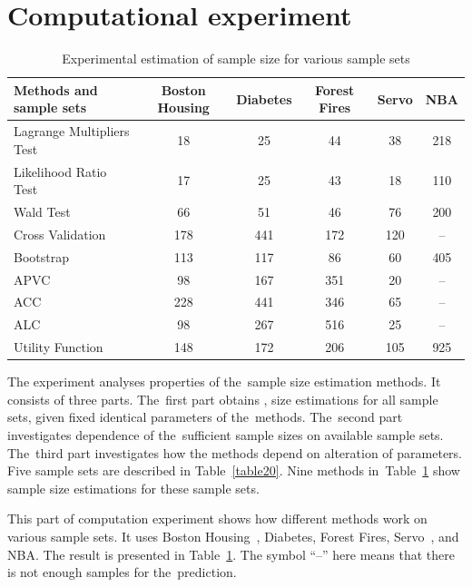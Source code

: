 \documentclass[
11pt,%
tightenlines,%
twoside,%
onecolumn,%
nofloats,%
nobibnotes,%
nofootinbib,%
superscriptaddress,%
noshowpacs,%
centertags]%
{revtex4}
\begin{document}
\section{Computational experiment}
\begin{table}[!htp]
\centering
\caption{Experimental estimation of sample size  for various sample sets}
\label{table2}
\begin{tabular}{l|c|c|c|c|c}
\hline
 Methods and sample sets & Boston Housing & Diabetes & Forest Fires & Servo & NBA \\ \hline
Lagrange Multipliers Test & 18 & 25 & 44 & 38 & 218 \\ \hline
Likelihood Ratio Test & 17 & 25 & 43 & 18 & 110 \\ \hline
Wald Test & 66 & 51 & 46 & 76 & 200 \\ \hline
Cross Validation & 178 & 441 & 172 & 120 & -- \\ \hline
Bootstrap & 113 & 117 & 86 & 60 & 405 \\ \hline
APVC & 98 & 167 & 351 & 20 & -- \\ \hline
ACC & 228 & 441 & 346 & 65 & -- \\ \hline
ALC & 98 & 267 & 516 & 25 & -- \\ \hline
Utility Function & 148 & 172 & 206 & 105 & 925 \\ \hline
\end{tabular}
\end{table}

The experiment analyses  properties of the~sample size  estimation
methods. It consists of three parts. The~first part obtains , size
estimations for all sample sets, given fixed identical parameters of
the~methods. The~second part investigates dependence of
the~sufficient sample sizes on available sample sets. The~third part
investigates how the methods depend on alteration of parameters.
Five sample sets are described in Table~\ref{table20}. Nine methods
in~Table~\ref{table2} show sample size estimations for these sample
sets.

This part of computation experiment shows how different methods
work on various sample sets. It uses Boston Housing~\cite{boston},
Diabetes, Forest Fires, Servo~\cite{servo}, and NBA. The result is
presented in Table~\ref{table2}. The symbol ``--'' here means that
there is not enough samples for the~prediction.
\end{document}
